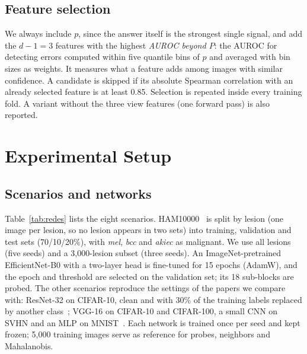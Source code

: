 \documentclass[conference,a4paper]{IEEEtran}
\begin{document}
\subsection{Feature selection}
We always include $p$, since the answer itself is the strongest single signal, and add the $d-1=3$ features with the highest
\emph{AUROC beyond $P$}: the AUROC for detecting errors computed within five quantile bins of $p$ and averaged with bin sizes as weights.
It measures what a feature adds among images with similar confidence. A candidate is skipped if its absolute Spearman correlation with
an already selected feature is at least 0.85. Selection is repeated inside every training fold. A variant without the three view features
(one forward pass) is also reported.

\section{Experimental Setup}

\subsection{Scenarios and networks}
Table~\ref{tab:redes} lists the eight scenarios. HAM10000~\cite{tschandl2018} is split by lesion (one image per lesion, so no lesion
appears in two sets) into training, validation and test sets (70/10/20\%), with \textit{mel}, \textit{bcc} and \textit{akiec} as malignant.
We use all lesions (five seeds) and a 3,000-lesion subset (three seeds). An ImageNet-pretrained EfficientNet-B0 with a two-layer head is
fine-tuned for 15 epochs (AdamW), and the epoch and threshold are selected on the validation set; its 18 sub-blocks are probed.
The other scenarios reproduce the settings of the papers we compare with: ResNet-32 on CIFAR-10, clean and with 30\% of the training
labels replaced by another class~\cite{chen2019}; VGG-16 on CIFAR-10 and CIFAR-100, a small CNN on SVHN and an MLP on MNIST~\cite{corbiere2019,jaeger2023}.
Each network is trained once per seed and kept frozen; 5,000 training images serve as reference for probes, neighbors and Mahalanobis.
\end{document}

